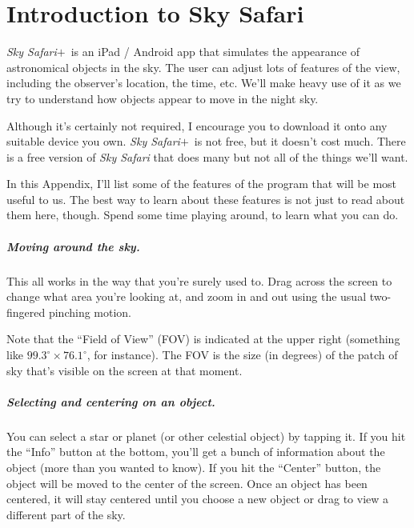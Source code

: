 \chapter{Introduction to Sky Safari}
\newcommand{\skysaf}{\textit{Sky Safari$+$}}
\newcommand{\icon}[1]{\texttt{[image: figs/stell-\#1.eps]}}

\bigskip\bigskip

\skysaf\ is an iPad / Android app that simulates the appearance
of astronomical objects in the sky. The user can adjust lots of
features of the view, including the observer's location,
the time, etc. We'll make heavy use of it as we try to understand
how objects appear to move in the night sky.

Although it's certainly not required, 
I encourage you to download it onto any suitable device
you own. \skysaf\ is not free, but it doesn't cost much.
There is a free version
of \textit{Sky Safari} that does many but not all of the things we'll want.

In this Appendix, I'll list some of the features of the program that will
be most useful to us. The best way to learn about these features is not
just to read about them here, though. Spend some time playing around, to learn
what you can do.


\paragraph{Moving around the sky.} 
This all works in the way that you're surely used to.
Drag across the screen to change what area you're looking at,
and zoom in and out using the usual two-fingered pinching motion.

Note that the ``Field of View'' (FOV) is indicated
at the upper right (something like $99.3^\circ\times 76.1^\circ$, for
instance). The FOV is the size (in degrees) of the
patch of sky that's visible on the screen at that moment.

\paragraph{Selecting and centering on an object.}
You can select a star or planet (or other celestial object)
by tapping it.
If you hit the ``Info'' button at the bottom,
you'll get a bunch of information about the object
(more than you wanted to know).
If you hit the
``Center'' button, the object will be moved
to the center of the screen. Once an object has been centered, it will
stay centered until you choose a new object or drag to view
a different part of the sky.

